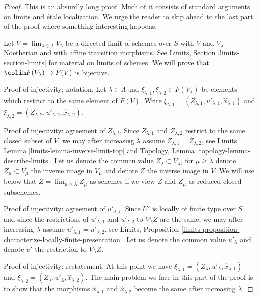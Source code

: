 \begin{proof}
This is an absurdly long proof. Much of it consists of standard
arguments on limits and \'etale localization. We urge the reader to skip ahead
to the last part of the proof where something interesting happens.

\medskip\noindent
Let $V = \lim_{\lambda \in \Lambda} V_\lambda$ be a directed limit of schemes
over $S$ with $V$ and $V_\lambda$ Noetherian and with affine transition
morphisms. See Limits, Section \ref{limits-section-limits} for material on
limits of schemes. We will prove that $\colim F(V_\lambda) \to F(V)$
is bijective.

\medskip\noindent
Proof of injectivity: notation.
Let $\lambda \in \Lambda$ and
$\xi_{\lambda, 1}, \xi_{\lambda, 2} \in F(V_\lambda)$ 
be elements which restrict to the same element of $F(V)$.
Write $\xi_{\lambda, 1} = (Z_{\lambda, 1}, u'_{\lambda, 1},
\hat x_{\lambda, 1})$ and
$\xi_{\lambda, 2} = (Z_{\lambda, 2}, u'_{\lambda, 2}, \hat x_{\lambda, 2})$.

\medskip\noindent
Proof of injectivity: agreement of $Z_{\lambda, i}$.
Since $Z_{\lambda, 1}$ and $Z_{\lambda, 2}$ restrict to the same closed
subset of $V$, we may after increasing $\lambda$ assume
$Z_{\lambda, 1} = Z_{\lambda, 2}$, see
Limits, Lemma \ref{limits-lemma-inverse-limit-top} and
Topology, Lemma \ref{topology-lemma-describe-limits}.
Let us denote the common value $Z_\lambda \subset V_\lambda$, for
$\mu \geq \lambda$
denote $Z_\mu \subset V_\mu$ the inverse image in $V_\mu$ and
denote $Z$ the inverse image in $V$. We will use below that
$Z = \lim_{\mu \geq \lambda} Z_\mu$ as schemes if we view $Z$
and $Z_\mu$ as reduced closed subschemes.

\medskip\noindent
Proof of injectivity: agreement of $u'_{\lambda, i}$.
Since $U'$ is locally of finite type over $S$ and since
the restrictions of $u'_{\lambda, 1}$ and $u'_{\lambda, 2}$
to $V \setminus Z$ are the same, we may after increasing $\lambda$ assume
$u'_{\lambda, 1} = u'_{\lambda, 2}$, see Limits, Proposition
\ref{limits-proposition-characterize-locally-finite-presentation}.
Let us denote the common value $u'_\lambda$ and denote
$u'$ the restriction to $V \setminus Z$.

\medskip\noindent
Proof of injectivity: restatement.
At this point we have
$\xi_{\lambda, 1} = (Z_\lambda, u'_\lambda, \hat x_{\lambda, 1})$ and
$\xi_{\lambda, 2} = (Z_\lambda, u'_\lambda, \hat x_{\lambda, 2})$.
The main problem we face in this part of the proof
is to show that the morphisms
$\hat x_{\lambda, 1}$ and $\hat x_{\lambda, 2}$ become the same after
increasing $\lambda$.


\end{proof}
